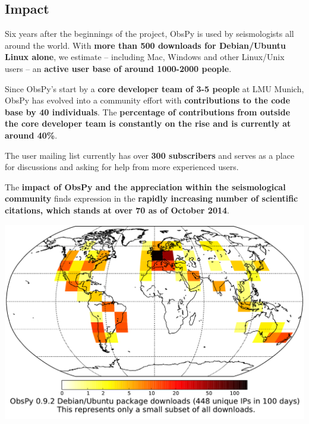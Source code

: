 \small

\begin{multicols}{2}
\section*{Impact}
Six years after the beginnings of the project, ObsPy is used by
seismologists all around the world. With \textbf{more than 500 downloads for
Debian/Ubuntu Linux alone}, we estimate -- including Mac, Windows and other
Linux/Unix users -- an \textbf{active user base of around 1000-2000 people}.

Since ObsPy's start by a \textbf{core developer team of 3-5 people} at LMU Munich, ObsPy
has evolved into a community effort with \textbf{contributions to the code base
by 40 individuals}. The \textbf{percentage of contributions from outside the core
developer team is constantly on the rise and is currently at around 40\%}.

The user mailing list currently has over \textbf{300 subscribers} and serves as a
place for discussions and asking for help from more experienced users.

The \textbf{impact of ObsPy and the appreciation within the seismological
community} finds expression in the \textbf{rapidly increasing number of scientific
citations, which stands at over 70 as of October 2014}.
%
%
\columnbreak
\begin{center}
    \includegraphics[width=0.8\columnwidth]{./images/obspy-deb.pdf} \\
\end{center}


\end{multicols}
